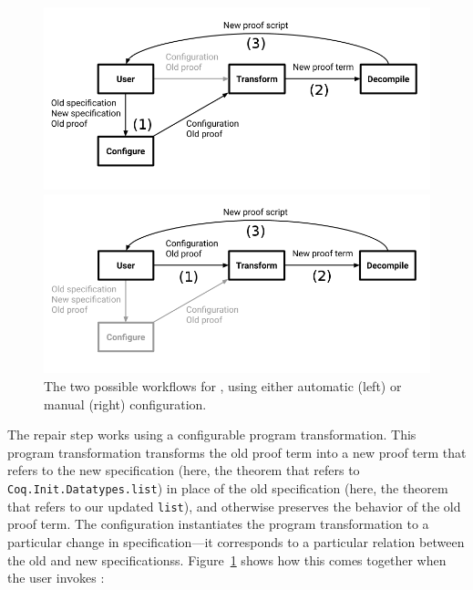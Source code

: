 \begin{figure}
\begin{minipage}{0.49\textwidth}
\includegraphics[width=\linewidth]{workflowa.png}
\end{minipage}
\hfill
\begin{minipage}{0.49\textwidth}
\includegraphics[width=\linewidth]{workflowb.png}
\end{minipage}
\caption{The two possible workflows for \toolname, using either automatic (left) or manual (right) configuration.}
\label{fig:system}
\end{figure}

The repair step works using a configurable program transformation.
This program transformation transforms the old proof term into a new proof term that refers to the new specification
(here, the theorem that refers to \lstinline{Coq.Init.Datatypes.list})
in place of the old specification (here, the theorem that refers to our updated \lstinline{list}),
and otherwise preserves the behavior of the old proof term.
The configuration instantiates the program transformation to a particular change in specification---it corresponds
to a particular relation between the old and new specificationss.
Figure~\ref{fig:system} shows how this comes together when the user invokes \toolname:

